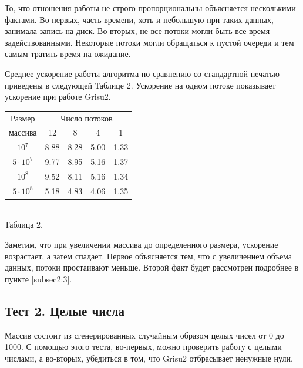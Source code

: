 То, что отношения работы не строго пропорциональны объясняется несколькими фактами.
Во-первых, часть времени, хоть и небольшую при таких данных, занимала запись на диск.
Во-вторых, не все потоки могли быть все время задействованными.
Некоторые потоки могли обращаться к пустой очереди и тем самым тратить время на ожидание.

Среднее ускорение работы алгоритма по сравнению со стандартной печатью приведены в следующей Таблице 2.
Ускорение на одном потоке показывает ускорение при работе \textsf{Grisu2}.
\begin{center}
\begin{tabular}{||c|c|c|c|c||}
\hline
\hline
Размер & \multicolumn{4}{c||}{Число потоков}\\
\hhline{~|-|-|-|-|}
массива & 12 & 8 & 4 & 1 \\
\hline
$10^7$ &  8.88 & 8.28 & 5.00 & 1.33 \\
\hline
$5 \cdot 10^7$ & 9.77& 8.95 & 5.16 & 1.37 \\
\hline
$10^8$ & 9.52 & 8.11 & 5.16 & 1.34\\
\hline
$5 \cdot 10^8$ & 5.18 & 4.83 & 4.06 & 1.35\\
\hline
\hline
\end{tabular}
\\\vspace{10pt}
\small{Таблица 2.}
\end{center}

Заметим, что при увеличении массива до определенного размера, ускорение возрастает, а затем спадает.
Первое объясняется тем, что с увеличением объема данных, потоки простаивают меньше.
Второй факт будет рассмотрен подробнее в пункте \ref{subsec2:3}.

\subsection{Тест 2. Целые числа} \label{test2}
Массив состоит из сгенерированных случайным образом целых чисел от 0 до 1000.
С помощью этого теста, во-первых, можно проверить работу с целыми числами, а во-вторых, убедиться в том, что \textsf{Grisu2} отбрасывает ненужные нули.

